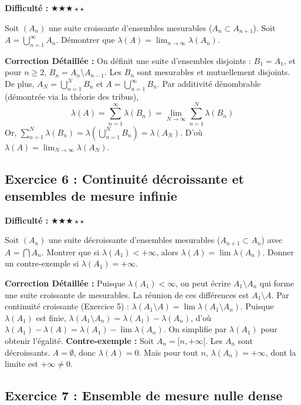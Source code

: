 \documentclass[11pt,a4paper]{article}
\begin{document}
\textbf{Difficulté :} $\bigstar\bigstar\bigstar\star\star$

Soit $(A_n)$ une suite croissante d'ensembles mesurables ($A_n \subset A_{n+1}$). Soit $A = \bigcup_{n=1}^\infty A_n$. Démontrer que $\lambda(A) = \lim_{n \to \infty} \lambda(A_n)$.

\textbf{Correction Détaillée :}
On définit une suite d'ensembles disjoints : $B_1 = A_1$, et pour $n \ge 2$, $B_n = A_n \setminus A_{n-1}$.
Les $B_n$ sont mesurables et mutuellement disjoints. De plus, $A_N = \bigcup_{n=1}^N B_n$ et $A = \bigcup_{n=1}^\infty B_n$.
Par additivité dénombrable (démontrée via la théorie des tribus),
$$\lambda(A) = \sum_{n=1}^\infty \lambda(B_n) = \lim_{N \to \infty} \sum_{n=1}^N \lambda(B_n)$$
Or, $\sum_{n=1}^N \lambda(B_n) = \lambda\left(\bigcup_{n=1}^N B_n\right) = \lambda(A_N)$.
D'où $\lambda(A) = \lim_{N \to \infty} \lambda(A_N)$.

\newpage
\subsection*{Exercice 6 : Continuité décroissante et ensembles de mesure infinie}

\textbf{Difficulté :} $\bigstar\bigstar\bigstar\star\star$

Soit $(A_n)$ une suite décroissante d'ensembles mesurables ($A_{n+1} \subset A_n$) avec $A = \bigcap A_n$. Montrer que si $\lambda(A_1) < +\infty$, alors $\lambda(A) = \lim \lambda(A_n)$. Donner un contre-exemple si $\lambda(A_1) = +\infty$.

\textbf{Correction Détaillée :}
Puisque $\lambda(A_1) < \infty$, on peut écrire $A_1 \setminus A_n$ qui forme une suite croissante de mesurables. La réunion de ces différences est $A_1 \setminus A$.
Par continuité croissante (Exercice 5) :
$\lambda(A_1 \setminus A) = \lim \lambda(A_1 \setminus A_n)$.
Puisque $\lambda(A_1)$ est finie, $\lambda(A_1 \setminus A_n) = \lambda(A_1) - \lambda(A_n)$, d'où $\lambda(A_1) - \lambda(A) = \lambda(A_1) - \lim \lambda(A_n)$. On simplifie par $\lambda(A_1)$ pour obtenir l'égalité.
\textbf{Contre-exemple :} Soit $A_n = [n, +\infty[$. Les $A_n$ sont décroissants. $A = \emptyset$, donc $\lambda(A) = 0$. Mais pour tout $n$, $\lambda(A_n) = +\infty$, dont la limite est $+\infty \neq 0$.

\newpage
\subsection*{Exercice 7 : Ensemble de mesure nulle dense}
\end{document}
